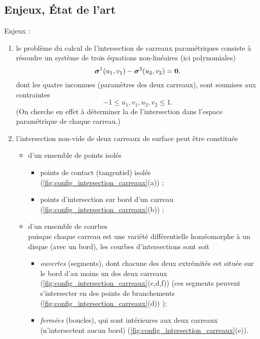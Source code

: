 \subsection{Enjeux, État de l'art}
Enjeux :
\begin{enumerate}
	\item le problème du calcul de l'intersection de carreaux paramétriques consiste à résoudre un système de trois équations non-linéaires (ici polynomiales)
	\begin{equation}
		\bm{\sigma}^1(u_1,v_1) - \bm{\sigma}^2(u_2, v_2) = \bm{0},
		\label{eq:intersection_2_carreaux}
	\end{equation}
	dont les quatre inconnues (paramètres des deux carreaux), sont soumises aux contraintes
	\begin{equation}
		-1 \leq u_1, v_1, u_2, v_2 \leq 1.
	\end{equation}
	(On cherche en effet à déterminer la  de l'intersection dans l'espace paramétrique de chaque carreau.)
	
	\item l'intersection non-vide de deux carreaux de surface peut être constituée
	\begin{itemize}
		\item d'un ensemble de points isolés 
		\begin{itemize}
			\item points de contact (tangentiel) isolés (\autoref{fig:config_intersection_carreaux}(a)) ;
			\item points d'intersection sur bord d'un carreau (\autoref{fig:config_intersection_carreaux}(b)) ;
		\end{itemize}
		\item d'un ensemble de courbes\\
		puisque chaque carreau est une variété différentielle homéomorphe à un disque (\ie avec un bord), les courbes d'intersections sont soit 
		\begin{itemize}
			\item \textit{ouvertes} (segments), dont chacune des deux extrémités est située sur le bord d'au moins un des deux carreaux (\autoref{fig:config_intersection_carreaux}(c,d,f)) (ces segments peuvent s'intersecter en des points de branchements (\autoref{fig:config_intersection_carreaux}(d)) );
			\item \textit{fermées} (boucles), qui sont intérieures aux deux carreaux (\ie n'intersectent aucun bord) (\autoref{fig:config_intersection_carreaux}(e)).
		\end{itemize}
	

\end{itemize}
\end{enumerate}
